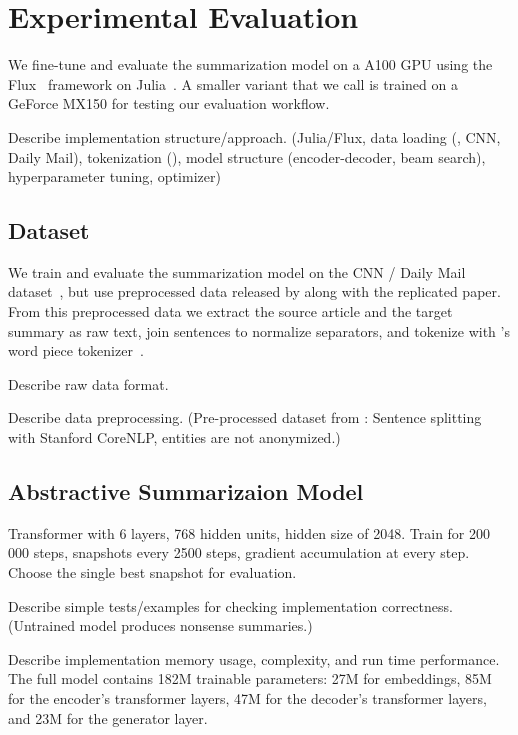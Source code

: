 \section{Experimental Evaluation} %

We fine-tune and evaluate the \BertSumAbs summarization model on a A100 GPU using the Flux~\cite{InnesSFGRJKPS2018} framework on Julia~\cite{BezansonEKS2017}.
A smaller variant that we call \TransformerAbsTiny is trained on a GeForce MX150 for testing our evaluation workflow.

Describe implementation structure/approach. (Julia/Flux, data loading (\Bert, CNN, Daily Mail), tokenization (\Bert), model structure (encoder-decoder, beam search), hyperparameter tuning, optimizer)

\subsection{Dataset}

We train and evaluate the summarization model on the CNN / Daily Mail dataset~\cite{HermannKGEKSB2015}, but use preprocessed data released by \citeauthor{LiuL2019} along with the replicated paper.
From this preprocessed data we extract the source article and the target summary as raw text, join sentences to normalize separators, and tokenize with \Bert's word piece tokenizer~\cite{DevlinCLT2019}.

Describe raw data format.

Describe data preprocessing. (Pre-processed dataset from \citeauthor{LiuL2019}: Sentence splitting  with Stanford CoreNLP, entities are not anonymized.)

\subsection{Abstractive Summarizaion Model}

Transformer with 6 layers, 768 hidden units, hidden size of 2048.
Train for 200\,000 steps, snapshots every 2500 steps, gradient accumulation at every step.
Choose the single best snapshot for evaluation.

Describe simple tests/examples for checking implementation correctness. (Untrained model produces nonsense summaries.)

Describe implementation memory usage, complexity, and run time performance.
The full \BertSumAbs model contains 182M trainable parameters: 27M for embeddings, 85M for the encoder's transformer layers, 47M for the decoder's transformer layers, and 23M for the generator layer.

